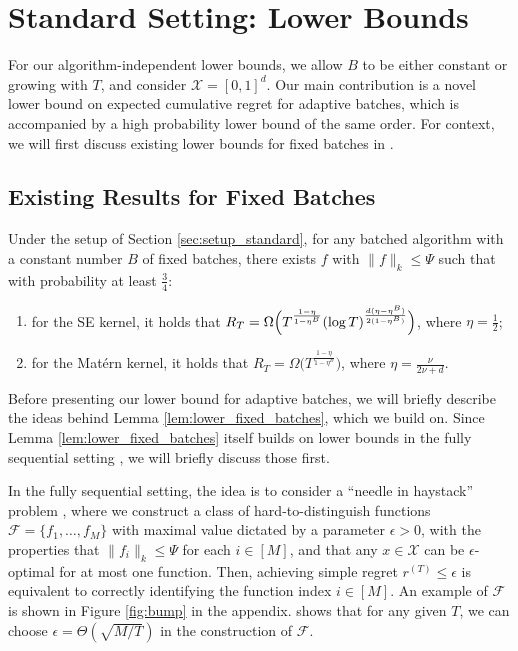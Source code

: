 \documentclass[10pt]{article}
\begin{document}
\section{Standard Setting: Lower Bounds}
\label{sec:standard_lower_bound}

For our algorithm-independent lower bounds, we allow $B$ to be either constant or growing with $T$, and consider $\mathcal{X} = [0,1]^d$.
Our main contribution is a novel lower bound on expected cumulative regret for adaptive batches, which is accompanied by a high probability lower bound of the same order. For context, we will first discuss existing lower bounds for fixed batches in \citep{Li22}.

\subsection{Existing Results for Fixed Batches}
\label{sec:adaptive_batches_preliminary}
\begin{lemma}
    \emph{\citep[Theorem 3]{Li22}}
    \label{lem:lower_fixed_batches}
    Under the setup of Section \ref{sec:setup_standard},
    for any batched algorithm with a constant number $B$ of fixed batches, there exists $f$ with $\lVert f\rVert_k \leq \Psi$ such that with probability at least $\frac{3}{4}$:
    \begin{enumerate}
        \item for the SE kernel, it holds that $R_T=\Omega\Bigl(T^\frac{1-\eta}{1-\eta^B}(\log T)^{\frac{d(\eta-\eta^B)}{2(1-\eta^B)}} \Bigr)$, where $\eta=\frac{1}{2}$;
        \item for the Mat\'ern kernel, it holds that $R_T=\Omega\bigl(T^\frac{1-\eta}{1-\eta^B}\bigr)$, where $\eta=\frac{\nu}{2\nu+d}$.
    \end{enumerate}
\end{lemma}

Before presenting our lower bound for adaptive batches, we will briefly describe the ideas behind Lemma \ref{lem:lower_fixed_batches}, which we build on. Since Lemma \ref{lem:lower_fixed_batches} itself builds on lower bounds in the fully sequential setting \citep{Scarlett17}, we will briefly discuss those first.

In the fully sequential setting, the idea is to consider a ``needle in haystack'' problem \citep{Scarlett17, Cai21}, where we construct a class of hard-to-distinguish functions $\mathcal{F}=\{f_1,\ldots,f_M\}$ with maximal value dictated by a parameter $\epsilon>0$, with the properties that $\lVert f_i\rVert_k \leq \Psi$ for each $i\in[M]$, and that any $x\in\mathcal{X}$ can be $\epsilon$-optimal for at most one function. Then, achieving simple regret $r^{(T)} \leq \epsilon$ is equivalent to correctly identifying the function index $i\in[M]$. An example of $\mathcal{F}$ is shown in Figure \ref{fig:bump} in the appendix. \citep{Scarlett17} shows that for any given $T$, we can choose $\epsilon = \Theta(\sqrt{M/T})$ in the construction of $\mathcal{F}$.
\end{document}
